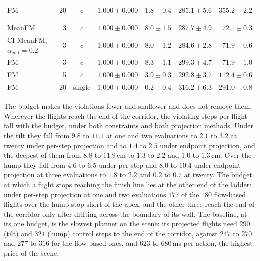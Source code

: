 \begin{table}[htpb]
\begin{tabularx}{\linewidth}{@{}L r c rrrr@{}}
    FM & 20 & $c$ & $1.000 \pm 0.000$ & $1.8 \pm 0.4$ & $285.1 \pm 5.6$ & $355.2 \pm 2.2$ \\
     &  &  &  &  &  &  \\
    \addlinespace[3pt]
    \\
    MeanFM & 3 & $c$ & $1.000 \pm 0.000$ & $8.0 \pm 1.5$ & $287.7 \pm 4.9$ & $72.1 \pm 0.3$ \\
    CI-MeanFM, $\alpha_{\mathrm{end}}=0.2$ & 3 & $c$ & $1.000 \pm 0.000$ & $8.0 \pm 1.2$ & $284.6 \pm 2.8$ & $71.9 \pm 0.6$ \\
    FM & 3 & $c$ & $1.000 \pm 0.000$ & $8.3 \pm 1.1$ & $299.3 \pm 4.7$ & $71.9 \pm 1.0$ \\
    FM & 5 & $c$ & $1.000 \pm 0.000$ & $3.9 \pm 0.3$ & $292.8 \pm 3.7$ & $112.4 \pm 0.6$ \\
    FM & 20 & single & $1.000 \pm 0.000$ & $0.2 \pm 0.4$ & $316.2 \pm 6.3$ & $291.0 \pm 0.8$ \\
    \bottomrule
  \end{tabularx}
\end{table}

The budget makes the violations fewer and shallower and does not remove them. Wherever the flights reach
the end of the corridor, the violating steps per flight fall with the budget, under both constraints and
both projection methods. Under the tilt they fall from $9.8$ to $11.1$ at one and two evaluations to $2.1$
to $3.2$ at twenty under per-step projection and to $1.4$ to $2.5$ under endpoint projection, and the
deepest of them from $8.8$ to $11.9$\,cm to $1.3$ to $2.2$ and $1.0$ to $1.3$\,cm. Over the hump they fall
from $4.6$ to $6.5$ under per-step and $8.0$ to $10.4$ under endpoint projection at three evaluations to
$1.8$ to $2.2$ and $0.2$ to $0.7$ at twenty. The budget at which a flight stops reaching the finish line lies
at the other end of the ladder: under per-step projection at one and two evaluations $177$ of the $180$
flow-based flights over the hump stop short of the apex, and the other three reach the end of the corridor
only after drifting across the boundary of its wall. The baseline, at its one budget, is the slowest
planner on the scene: its projected flights need $290$ (tilt) and $321$ (hump) control steps to the end of
the corridor, against $247$ to $270$ and $277$ to $316$ for the flow-based ones, and $623$ to $680$\,ms
per action, the highest price of the scene.

